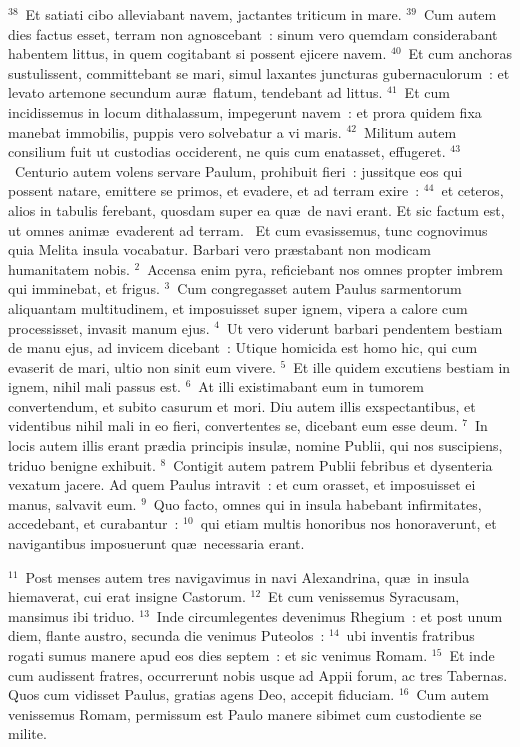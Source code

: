 ${}^{38}$~Et satiati cibo alleviabant navem, jactantes triticum in mare.
${}^{39}$~Cum autem dies factus esset, terram non agnoscebant~: sinum vero quemdam considerabant habentem littus, in quem cogitabant si possent ejicere navem.
${}^{40}$~Et cum anchoras sustulissent, committebant se mari, simul laxantes juncturas gubernaculorum~: et levato artemone secundum aur\ae\ flatum, tendebant ad littus.
${}^{41}$~Et cum incidissemus in locum dithalassum, impegerunt navem~: et prora quidem fixa manebat immobilis, puppis vero solvebatur a vi maris.
${}^{42}$~Militum autem consilium fuit ut custodias occiderent, ne quis cum enatasset, effugeret.
${}^{43}$~Centurio autem volens servare Paulum, prohibuit fieri~: jussitque eos qui possent natare, emittere se primos, et evadere, et ad terram exire~:
${}^{44}$~et ceteros, alios in tabulis ferebant, quosdam super ea qu\ae\ de navi erant. Et sic factum est, ut omnes anim\ae\ evaderent ad terram.
~\lettrine[lines=10,image=true,loversize=0.05,lraise=-0.03]{E}{}t cum evasissemus, tunc cognovimus quia Melita insula vocabatur. Barbari vero pr\ae stabant non modicam humanitatem nobis.
${}^{2}$~Accensa enim pyra, reficiebant nos omnes propter imbrem qui imminebat, et frigus.
${}^{3}$~Cum congregasset autem Paulus sarmentorum aliquantam multitudinem, et imposuisset super ignem, vipera a calore cum processisset, invasit manum ejus.
${}^{4}$~Ut vero viderunt barbari pendentem bestiam de manu ejus, ad invicem dicebant~: Utique homicida est homo hic, qui cum evaserit de mari, ultio non sinit eum vivere.
${}^{5}$~Et ille quidem excutiens bestiam in ignem, nihil mali passus est.
${}^{6}$~At illi existimabant eum in tumorem convertendum, et subito casurum et mori. Diu autem illis exspectantibus, et videntibus nihil mali in eo fieri, convertentes se, dicebant eum esse deum.
${}^{7}$~In locis autem illis erant pr\ae dia principis insul\ae , nomine Publii, qui nos suscipiens, triduo benigne exhibuit.
${}^{8}$~Contigit autem patrem Publii febribus et dysenteria vexatum jacere. Ad quem Paulus intravit~: et cum orasset, et imposuisset ei manus, salvavit eum.
${}^{9}$~Quo facto, omnes qui in insula habebant infirmitates, accedebant, et curabantur~:
${}^{10}$~qui etiam multis honoribus nos honoraverunt, et navigantibus imposuerunt qu\ae\ necessaria erant.


${}^{11}$~Post menses autem tres navigavimus in navi Alexandrina, qu\ae\ in insula hiemaverat, cui erat insigne Castorum.
${}^{12}$~Et cum venissemus Syracusam, mansimus ibi triduo.
${}^{13}$~Inde circumlegentes devenimus Rhegium~: et post unum diem, flante austro, secunda die venimus Puteolos~:
${}^{14}$~ubi inventis fratribus rogati sumus manere apud eos dies septem~: et sic venimus Romam.
${}^{15}$~Et inde cum audissent fratres, occurrerunt nobis usque ad Appii forum, ac tres Tabernas. Quos cum vidisset Paulus, gratias agens Deo, accepit fiduciam.
${}^{16}$~Cum autem venissemus Romam, permissum est Paulo manere sibimet cum custodiente se milite.


